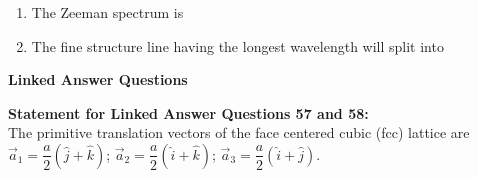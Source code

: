 \documentclass[14pt, a4paper]{extarticle}
\begin{document}
\begin{enumerate}[label=\textbf{Q. \arabic*}, start=55]

\item The Zeeman spectrum is
\begin{enumerate}[label=(\Alph*)]
\end{enumerate}

\item The fine structure line having the longest wavelength will split into
\begin{enumerate}[label=(\Alph*)]
\end{enumerate}

\end{enumerate}


\vspace{1.5em}
\noindent
\textbf{Linked Answer Questions}
\vspace{1em}

\noindent
\textbf{Statement for Linked Answer Questions 57 and 58:} \\
The primitive translation vectors of the face centered cubic (fcc) lattice are
$\vec{a}_1 = \dfrac{a}{2}(\hat{j}+\hat{k})$; $\vec{a}_2 = \dfrac{a}{2}(\hat{i}+\hat{k})$; $\vec{a}_3 = \dfrac{a}{2}(\hat{i}+\hat{j})$.
\end{document}
